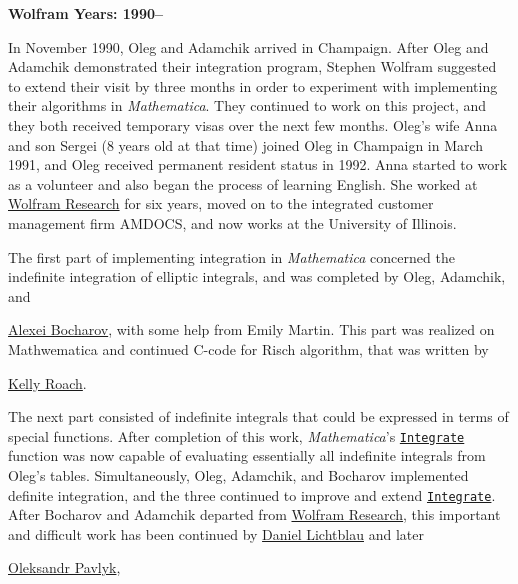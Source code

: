 \pagebreak



\noindent

\textbf{Wolfram Years: 1990–}



\noindent

In November 1990, Oleg and Adamchik arrived in Champaign. After Oleg and Adamchik demonstrated their integration program, Stephen Wolfram suggested to extend their visit by three months in order to experiment with implementing their algorithms in \textit{Mathematica}. They continued to work on this project, and they both received temporary visas over the next few months. Oleg's wife Anna and son Sergei (8 years old at that time) joined Oleg in Champaign in March 1991, and Oleg received permanent resident status in 1992. Anna started to work as a volunteer and also began the process of learning English. She worked at \href{http://www.wolfram.com/}{Wolfram Research} for six years, moved on to the integrated customer management firm AMDOCS, and now works at the University of Illinois.



The first part of implementing integration in \textit{Mathematica} concerned the indefinite integration of elliptic integrals, and was completed by Oleg, Adamchik, and 

\href{http://research.microsoft.com/en-us/um/people/alexeib/}{Alexei Bocharov}, with some help from Emily Martin.  This part was realized on Mathwematica and continued C-code for Risch algorithm, that was written by

\href{http://kellyroach.com/index.htm}{Kelly Roach}.

 The next part consisted of indefinite integrals that could be expressed in terms of special functions. After completion of this work, \textit{Mathematica}’s \href{http://reference.wolfram.com/language/ref/Integrate.html}{\texttt{Integrate}} function was now capable of evaluating essentially all indefinite integrals from Oleg's tables. Simultaneously, Oleg, Adamchik, and Bocharov implemented definite integration, and the three continued to improve and extend \href{http://reference.wolfram.com/language/ref/Integrate.html}{\texttt{Integrate}}. After Bocharov and Adamchik departed from \href{http://www.wolfram.com/}{Wolfram Research}, this important and difficult work has been continued by \href{https://www.linkedin.com/in/daniellichtblau}{Daniel Lichtblau} and later 

\href{https://www.linkedin.com/in/oleksandr-pavlyk-39a4034}{Oleksandr Pavlyk}, 

